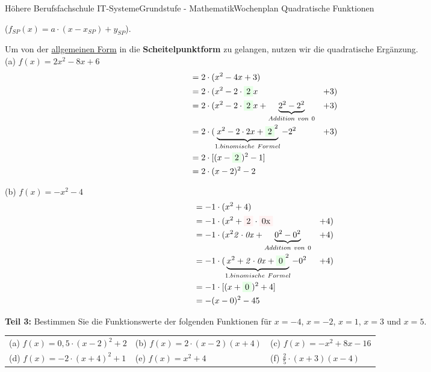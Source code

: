 \documentclass[oneside,openany,headings=optiontotoc,11pt,numbers=noenddot]{scrreprt}
\begin{document}
\begin{worksheet}{Höhere Berufsfachschule IT-Systeme}{Grundstufe - Mathematik}{Wochenplan Quadratische Funktionen}
\begin{framed}
			(\(f_{SP}(x) = a\cdot(x - x_{SP}) + y_{SP}\)).\\
			\par\noindent
			Um von der \underline{allgemeinen Form} in die \textbf{Scheitelpunktform} zu gelangen, nutzen wir die quadratische Ergänzung.\\
			(a) \(f(x) = 2x^2-8x+6\)\\
			\begin{align*}
				& = 2\cdot{}(x^2-4x+3)\\
				& = 2\cdot{}(x^2 - 2\cdot{}\colorbox{green!10}{2}x & +3)\\
				& = 2\cdot{}(x^2 - 2\cdot{}\colorbox{green!10}{2}x + \underbrace{2^2 - 2^2}_{Addition\ von\ 0} & + 3)\\
				& = 2\cdot{}(\underbrace{x^2-2\cdot{}2x + \colorbox{green!10}{2}^2}_{1. binomische\ Formel} -2^2 & + 3)\\
				& = 2\cdot{}[(x-\colorbox{green!10}{2})^2 - 1]\\
				& = 2\cdot{}(x-2)^2 - 2
			\end{align*}
			\par\noindent
			(b) \(f(x) = -x^2-4\)\\
			\begin{align*}
				& = -1\cdot{}(x^2+4)\\
				& = -1\cdot{}(x^2 + \colorbox{red!5}{2}\cdot{}\colorbox{red!5}{0x} & + 4)\\
				& = -1\cdot{}(x^2 \mathit{2\cdot{}0x} + \underbrace{0^2 - 0^2}_{Addition\ von\ 0} & + 4)\\
				& = -1\cdot{}(\underbrace{x^2 + \mathit{2\cdot{}0x} + \colorbox{green!10}{0}^2}_{1. binomische\ Formel} - 0^2 & + 4)\\
				& = -1\cdot{}[(x+\colorbox{green!10}{0})^2 + 4]\\
				& = -(x-0)^2 -45
			\end{align*}
		\end{framed}
		\begin{framed}
			\noindent
			\textbf{Teil 3:} Bestimmen Sie die Funktionswerte der folgenden Funktionen für \(x = -4\), \(x = -2\), \(x = 1\), \(x = 3\) und \(x = 5\).\\
			\par\noindent
			\begin{tabularx}{\textwidth}{XXX}
				(a) \(f(x) = 0,5\cdot(x-2)^2 + 2\) & (b) \(f(x) = 2\cdot(x-2)(x+4)\) & (c) \(f(x) = -x^2 + 8x -16\)\\
				(d) \(f(x) = -2\cdot(x+4)^2 + 1\) & (e) \(f(x) = x^2 + 4\) & (f) \(\frac{2}{5}\cdot(x+3)(x-4)\)

\end{tabularx}
\end{framed}
\end{worksheet}
\end{document}
